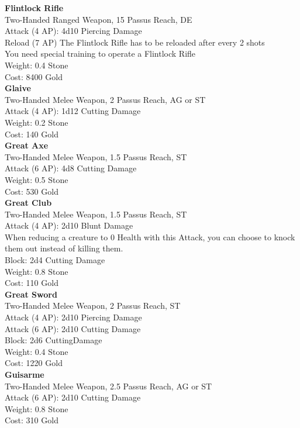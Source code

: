 \textbf{Flintlock Rifle}\\
Two-Handed Ranged Weapon, 15 Passus Reach, DE\\
Attack (4 AP): 4d10 Piercing Damage\\
Reload (7 AP) The Flintlock Rifle has to be reloaded after every 2 shots\\
You need special training to operate a Flintlock Rifle\\
Weight: 0.4 Stone\\
Cost: 8400 Gold\\

\textbf{Glaive}\\
Two-Handed Melee Weapon, 2 Passus Reach, AG or ST\\
Attack (4 AP): 1d12 Cutting Damage\\
Weight: 0.2 Stone\\
Cost: 140 Gold\\


\textbf{Great Axe}\\
Two-Handed Melee Weapon, 1.5 Passus Reach, ST\\
Attack (6 AP): 4d8 Cutting Damage\\
Weight: 0.5 Stone\\
Cost: 530 Gold\\

\textbf{Great Club}\\
Two-Handed Melee Weapon, 1.5 Passus Reach, ST\\
Attack (4 AP): 2d10 Blunt Damage\\
When reducing a creature to 0 Health with this Attack, you can choose to knock them out instead of killing them.\\
Block: 2d4 Cutting Damage\\
Weight: 0.8 Stone\\
Cost: 110 Gold\\


\textbf{Great Sword}\\
Two-Handed Melee Weapon, 2 Passus Reach, ST\\
Attack (4 AP): 2d10 Piercing Damage\\
Attack (6 AP): 2d10 Cutting Damage\\
Block: 2d6 CuttingDamage\\
Weight: 0.4 Stone\\
Cost: 1220 Gold\\


\textbf{Guisarme}\\
Two-Handed Melee Weapon, 2.5 Passus Reach, AG or ST\\
Attack (6 AP): 2d10 Cutting Damage\\
Weight: 0.8 Stone\\
Cost: 310 Gold\\


